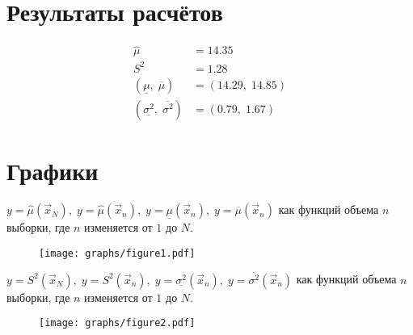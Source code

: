 
\section{Результаты расчётов}

\begin{align*}
    \hat{\mu} &= 14.35\\
    S^{2} &= 1.28\\
    (\underline{\mu},\;\overline{\mu}) &= (14.29,\;14.85)\\
    (\underline{\sigma^{2}},\;\overline{\sigma^{2}}) &= (0.79,\;1.67)
\end{align*}


\section{Графики}

$y=\hat{\mu}(\vec{x}_{N}),\; y=\hat{\mu}(\vec{x}_{n}),\; y=\underline{\mu}(\vec{x}_{n}),\; y=\overline{\mu}(\vec{x}_{n})$ как функций объема $n$ выборки, где  $n$ изменяется от $1$ до $N$.

\begin{figure}[h]
    \centering
    \texttt{[image: graphs/figure1.pdf]}
\end{figure}



\newpage

$y=S^{2}(\vec{x}_{N}),\; y=S^{2}(\vec{x}_{n}),\; y=\underline{\sigma^{2}}(\vec{x}_{n}),\; y=\overline{\sigma^{2}}(\vec{x}_{n})$ как функций объема $n$ выборки, где $n$ изменяется от $1$ до $N$.

\begin{figure}[h]
    \centering
    \texttt{[image: graphs/figure2.pdf]}
\end{figure}